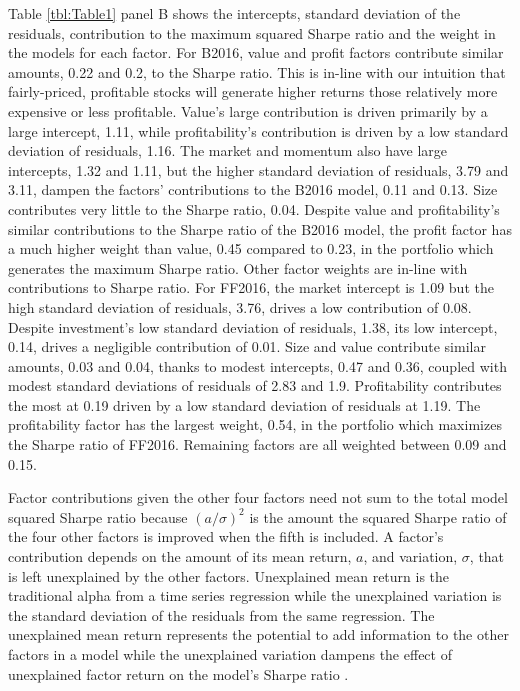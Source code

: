 Table \ref{tbl:Table1} panel B shows the intercepts, standard deviation of the residuals,
contribution to the maximum squared Sharpe ratio and the weight in the models for each
factor. For B2016, value and profit factors contribute similar amounts, 0.22 and 0.2, to
the Sharpe  ratio. This is in-line with our intuition that fairly-priced, profitable
stocks will generate higher  returns those relatively more expensive or less profitable.
Value's large contribution is driven primarily by a large intercept, 1.11, while
profitability's contribution is driven by a low standard deviation of residuals, 1.16. The
market and momentum also have large intercepts, 1.32 and  1.11, but the higher standard
deviation of residuals, 3.79 and 3.11, dampen the factors' contributions to the B2016
model,  0.11 and 0.13. Size contributes very little to the Sharpe ratio, 0.04. Despite
value and profitability's similar contributions to the Sharpe ratio of the B2016  model,
the profit factor has a much higher weight than value, 0.45 compared to 0.23, in the
portfolio which generates the maximum Sharpe ratio. Other factor weights are in-line with
contributions to Sharpe ratio. For FF2016, the market intercept is 1.09 but the high
standard deviation of residuals, 3.76,  drives a low contribution of 0.08. Despite
investment's low standard deviation of residuals, 1.38, its low intercept, 0.14,  drives a
negligible contribution of 0.01. Size and value contribute similar amounts, 0.03 and 0.04,
thanks to modest intercepts, 0.47  and 0.36, coupled with modest standard deviations of
residuals of 2.83 and 1.9. Profitability contributes the most at 0.19 driven by a low
standard deviation of residuals at  1.19. The profitability factor has the largest weight,
0.54, in the portfolio which maximizes the  Sharpe ratio of FF2016. Remaining factors are
all weighted between 0.09 and 0.15.

Factor contributions given the other four factors need not sum to the total model squared
Sharpe ratio because $(a/\sigma)^2$ is the amount the squared Sharpe ratio of the four
other  factors is improved when the fifth is included. A factor's contribution depends on
the amount of its mean return, $a$, and variation,  $\sigma$, that is left unexplained by
the other factors. Unexplained mean return is the traditional alpha from a time series
regression while the  unexplained variation is the standard deviation of the residuals
from the same regression. The unexplained mean return represents the potential to add
information to the other factors  in a model while the unexplained variation dampens the
effect of unexplained factor return on  the model's Sharpe ratio
\parencite{fama2016choosing}.
